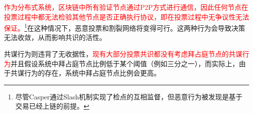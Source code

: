 \textcolor{red}{作为分布式系统，区块链中所有验证节点通过P2P方式进行通信，因此任何节点在投票过程中都无法检验其他节点是否正确执行协议，即在投票过程中无争议性无法保证。}\footnote{尽管Casper通过Slash机制实现了检点的互相监督，但恶意行为被发现是基于交易已经上链的前提。}在这种情况下，恶意投票和割裂网络将变得可行。这两种行为会导致决策无法收敛，从而影响共识的活性。%

共谋行为则违背了无收据性，\textcolor{red}{现有大部分投票共识都没有考虑拜占庭节点的共谋行为}并且假设系统中拜占庭节点比例低于某个阈值（例如三分之一），而实际上，由于共谋行为的存在，系统中拜占庭节点比例会更高。